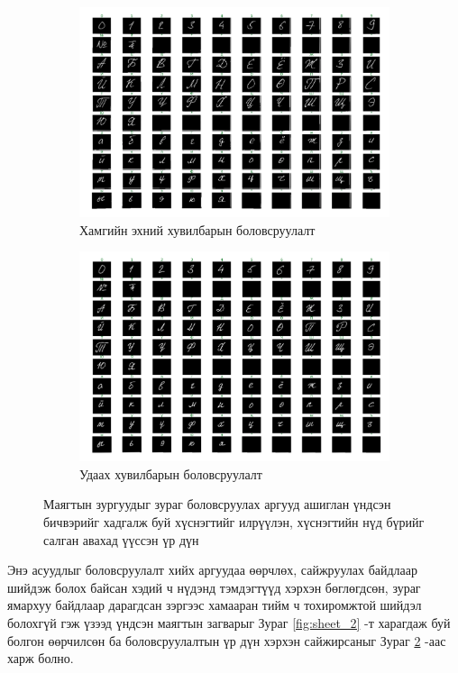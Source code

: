 \begin{figure}[ht]
	\begin{subfigure}{0.5\textwidth}
		\centering
		\includegraphics[width=0.9\linewidth]{images/sheet_1_segmented}
		\caption{Хамгийн эхний хувилбарын боловсруулалт}
		\label{fig:sheet_1_segmented}
	\end{subfigure}
	\begin{subfigure}{0.5\textwidth}
		\centering
		\includegraphics[width=0.9\linewidth]{images/sheet_2_segmented}
		\caption{Удаах хувилбарын боловсруулалт}
		\label{fig:sheet_2_segmented}
	\end{subfigure}
	\caption{Маягтын зургуудыг зураг боловсруулах аргууд ашиглан үндсэн бичвэрийг хадгалж буй хүснэгтийг илрүүлэн, хүснэгтийн нүд бүрийг салган авахад үүссэн үр дүн}
	\label{fig:sheets_cropped}
\end{figure}

Энэ асуудлыг боловсруулалт хийх аргуудаа өөрчлөх, сайжруулах байдлаар шийдэж болох байсан хэдий ч нүдэнд тэмдэгтүүд хэрхэн бөглөгдсөн, зураг ямархуу байдлаар дарагдсан зэргээс хамааран тийм ч тохиромжтой шийдэл болохгүй гэж үзээд үндсэн маягтын загварыг Зураг \ref{fig:sheet_2} -т харагдаж буй болгон өөрчилсөн ба боловсруулалтын үр дүн хэрхэн сайжирсаныг Зураг \ref{fig:sheet_2_segmented} -аас харж болно.

